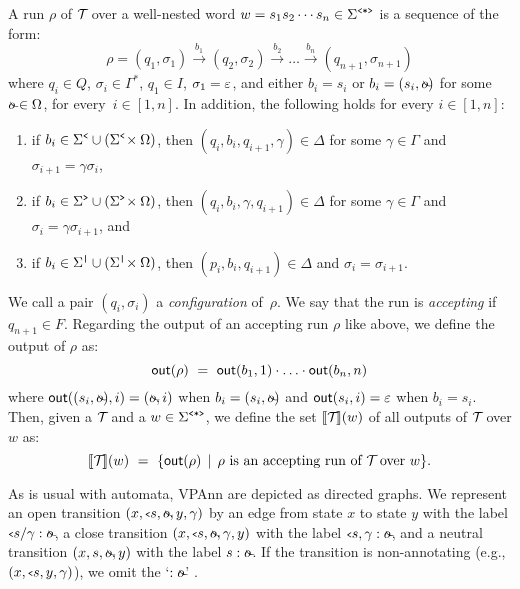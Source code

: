 A run $\rho$ of $\mathcal{T}\!$ over a well-nested word $w = s_1s_2\cdots s_n \in\Sigma^{\texttt{<*>}}$ %
is a sequence of the form:
$$
\rho = (q_1, \sigma_1) \xrightarrow{b_1} (q_2, \sigma_2) \xrightarrow{b_2} \ldots  \xrightarrow{b_n} (q_{n+1}, \sigma_{n+1})
$$
where $q_i \in Q$, $\sigma_i\in \Gamma^{*}$, $q_1 \in I$, $\sigma_1 = \varepsilon$, and either $b_i = s_i$ or $b_i = (s_i, \oout)$ for some $\oout \in \oalph$, for every~$i\in[1,n]$. In addition, the following holds for every $i\in[1,n]$:
\begin{enumerate}
	\item if $b_{i} \in \Sigma^{\texttt{<}} \cup (\Sigma^{\texttt{<}} \!\times \Omega)$, then $(q_i, b_i,q_{i+1},\gamma) \in \Delta$ for some $\gamma\in\Gamma$ and $\sigma_{i+1} = \gamma\sigma_i$,
	\item if $b_{i} \in \Sigma^{\texttt{>}} \cup (\Sigma^{\texttt{>}} \!\times \Omega)$, then $(q_i, b_i, \gamma, q_{i+1}) \in \Delta$ for some $\gamma\in\Gamma$ and $\sigma_i = \gamma\sigma_{i+1}$, and
	\item if $b_{i} \in \Sigma^{\texttt{|}} \cup (\Sigma^{\texttt{|}} \!\times \Omega)$, then $(p_i, b_i,q_{i+1})\in \Delta$ and $\sigma_i = \sigma_{i+1}$. 
\end{enumerate}
We call a pair $(q_i, \sigma_i)$ a \emph{configuration} of~$\rho$. We say that the run is \emph{accepting} if~$q_{n+1}\in F$. 
Regarding the output of an accepting run $\rho$ like above, we define the output of $\rho$ as:
$$
\textsf{out}(\rho) \ = \  \textsf{out}(b_1,1)\cdot \ldots \cdot \textsf{out}(b_n, n)
$$
where $\out((s_i,\oout), i) = (\oout,i)$ when $b_i = (s_i,\oout)$ and $\textsf{out}(s_i, i) = \varepsilon$ when $b_i = s_i$. 
Then, given a \vpann $\mathcal{T}\!$ and a $w \in\Sigma^{\texttt{<*>}}$, we define the set ${\llbracket{\mathcal{T}\!}\rrbracket}(w)$ of all outputs of $\mathcal{T}\!$ over $w$ as:
$$
{\llbracket{\mathcal{T}\!}\rrbracket}(w) \ = \ \{ \textsf{out}(\rho) \, \mid \, \text{$\rho$ is an accepting run of $\mathcal{T}\!$ over $w$}\}.
$$

As is usual with automata, VPAnn are depicted as directed graphs. We represent an open transition $(x,\op{s},\oout, y,\gamma)$ by an edge from state $x$ to state $y$ with the label $\op{s} / \gamma:\oout$, a close transition $(x,\op{s},\oout,\gamma,y)$ with the label $\op{s} \,\! ,\,\!  \gamma:\oout$, and a neutral transition $(x,s,\oout,y)$ with the label $s:\oout$. If the transition is non-annotating (e.g., $(x,{\scriptsize\texttt{<}} s, y,\gamma)$), we omit the `$: \oout$' .


